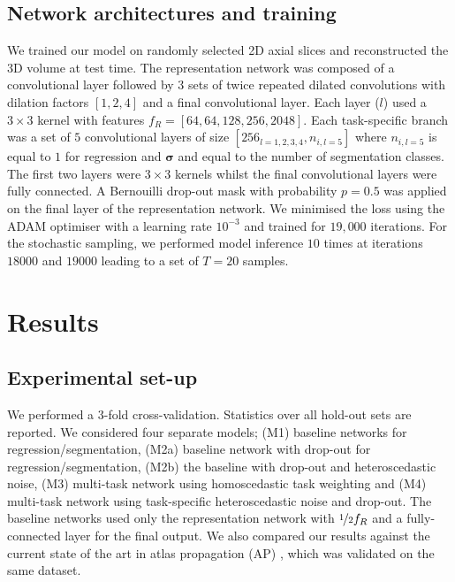 \subsection{Network architectures and training}\label{sec:imp_details} 
We trained our model on randomly selected 2D axial slices and reconstructed the 3D volume at test time. The representation network was composed of a convolutional layer followed by $3$ sets of twice repeated dilated convolutions \cite{yu2015multi} with dilation factors $[1,2,4]$ and a final convolutional layer. Each layer ($l$) used a $3 \times 3$ kernel with features $f_{R}=[64, 64, 128, 256, 2048]$. Each task-specific branch was a set of $5$ convolutional layers of size $[256_{l=1, 2, 3, 4},n_{i,l=5}]$ where $n_{i,l=5}$ is equal to $1$ for regression and $\bm{\sigma}$ and equal to the number of segmentation classes. The first two layers were $3 \times 3$ kernels whilst the final convolutional layers were fully connected. A Bernouilli drop-out mask with probability $p=0.5$ was applied on the final layer of the representation network. We minimised the loss using the ADAM optimiser \cite{kingma2014adam} with a learning rate $10^{-3}$ and trained for $19,000$ iterations. For the stochastic sampling, we performed model inference $10$ times at iterations $18000$ and $19000$ leading to a set of $T=20$ samples. 

\section{Results}



\subsection{Experimental set-up}
We performed a 3-fold cross-validation. Statistics over all hold-out sets are reported. We considered four separate models;  (M1) baseline networks for regression/segmentation, (M2a) baseline network with drop-out for regression/segmentation,  (M2b) the baseline with drop-out and heteroscedastic noise, (M3) multi-task network using homoscedastic task weighting  \cite{kendall2017multi} and (M4) multi-task network using task-specific heteroscedastic noise and drop-out. The baseline networks used only the representation network with $\nicefrac{1}{2}f_{R}$ and a fully-connected layer for the final output. We also compared our results against the current state of the art in atlas propagation (AP) \cite{ninon2017}, which was validated on the same dataset.

